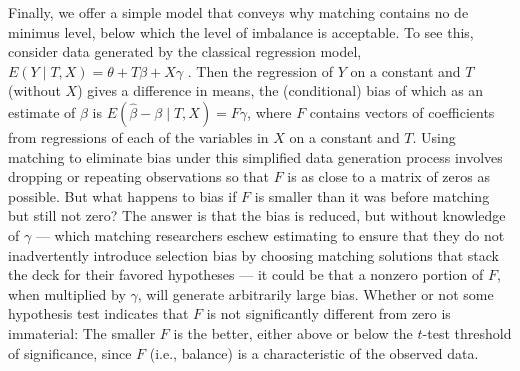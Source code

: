 \documentclass[11pt,titlepage]{article}
\begin{document}
Finally, we offer a simple model that conveys why matching contains no
de minimus level, below which the level of imbalance is acceptable.
To see this, consider data generated by the classical regression
model, $E(Y\mid T,X)= \theta + T\beta + X\gamma$ \citep{Goldberger91}.
Then the regression of $Y$ on a constant and $T$ (without $X$) gives a
difference in means, the (conditional) bias of which as an estimate of
$\beta$ is $E(\hat\beta-\beta\mid T,X) = F\gamma$, where $F$ contains
vectors of coefficients from regressions of each of the variables in
$X$ on a constant and $T$.  Using matching to eliminate bias under
this simplified data generation process involves dropping or repeating
observations so that $F$ is as close to a matrix of zeros as possible.
But what happens to bias if $F$ is smaller than it was before matching
but still not zero?  The answer is that the bias is reduced, but
without knowledge of $\gamma$ --- which matching researchers eschew
estimating to ensure that they do not inadvertently introduce
selection bias by choosing matching solutions that stack the deck for
their favored hypotheses --- it could be that a nonzero portion of
$F$, when multiplied by $\gamma$, will generate arbitrarily large
bias.  Whether or not some hypothesis test indicates that $F$ is not
significantly different from zero is immaterial: The smaller $F$ is
the better, either above or below the $t$-test threshold of
significance, since $F$ (i.e., balance) is a characteristic of the
observed data.
\end{document}
